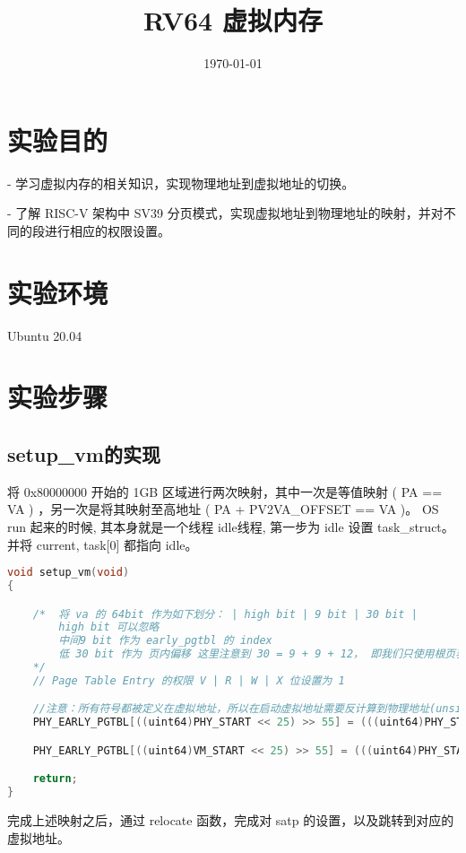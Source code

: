\documentclass{source/Report}
\title{RV64 虚拟内存}
\date{\today}
\begin{document}
\makecover
\makeheader
\section{实验目的}

- 学习虚拟内存的相关知识，实现物理地址到虚拟地址的切换。

- 了解 RISC-V 架构中 SV39 分页模式，实现虚拟地址到物理地址的映射，并对不同的段进行相应的权限设置。

\section{实验环境}
Ubuntu 20.04

\section{实验步骤}
\subsection{setup\_vm的实现}

将 0x80000000 开始的 1GB 区域进行两次映射，其中一次是等值映射 ( PA == VA ) ，另一次是将其映射至高地址 ( PA + PV2VA\_OFFSET == VA )。
OS run 起来的时候, 其本身就是一个线程 idle线程, 第一步为 idle 设置 task\_struct。并将 current, task[0] 都指向 idle。


\begin{lstlisting}[language = c, title = {setup\_vm}]
void setup_vm(void)
{

    /*  将 va 的 64bit 作为如下划分： | high bit | 9 bit | 30 bit |
        high bit 可以忽略
        中间9 bit 作为 early_pgtbl 的 index
        低 30 bit 作为 页内偏移 这里注意到 30 = 9 + 9 + 12， 即我们只使用根页表， 根页表的每个 entry 都对应 1GB 的区域。
    */
    // Page Table Entry 的权限 V | R | W | X 位设置为 1

    //注意：所有符号都被定义在虚拟地址，所以在启动虚拟地址需要反计算到物理地址(unsigned long *)((uint64)early_pgtbl - PA2VA_OFFSET)
    PHY_EARLY_PGTBL[((uint64)PHY_START << 25) >> 55] = (((uint64)PHY_START >> 30) << 28) + 0b0000001111; //等值映射

    PHY_EARLY_PGTBL[((uint64)VM_START << 25) >> 55] = (((uint64)PHY_START >> 30) << 28) + 0b0000001111; //至高映射

    return;
}
\end{lstlisting}

完成上述映射之后，通过 relocate 函数，完成对 satp 的设置，以及跳转到对应的虚拟地址。
\end{document}
